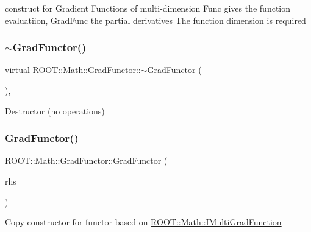 construct for Gradient Functions of multi-\/dimension Func gives the function evaluatiion, Grad\+Func the partial derivatives The function dimension is required \mbox{\label{classROOT_1_1Math_1_1GradFunctor_a1dfc4e8382f679a935eae97c5e7ee4dd}} 
\subsubsection{\texorpdfstring{$\sim$GradFunctor()}{~GradFunctor()}\hspace{0.1cm}{\footnotesize\ttfamily [1/2]}}
{\footnotesize\ttfamily virtual R\+O\+O\+T\+::\+Math\+::\+Grad\+Functor\+::$\sim$\+Grad\+Functor (\begin{DoxyParamCaption}{ }\end{DoxyParamCaption})\hspace{0.3cm}{\ttfamily [inline]}, {\ttfamily [virtual]}}

Destructor (no operations) \mbox{\label{classROOT_1_1Math_1_1GradFunctor_a629b55d9f326dbf39e5c3ccfb4678579}} 
\subsubsection{\texorpdfstring{GradFunctor()}{GradFunctor()}\hspace{0.1cm}{\footnotesize\ttfamily [5/10]}}
{\footnotesize\ttfamily R\+O\+O\+T\+::\+Math\+::\+Grad\+Functor\+::\+Grad\+Functor (\begin{DoxyParamCaption}\item[{const \mbox{\hyperlink{classROOT_1_1Math_1_1GradFunctor}{Grad\+Functor}} \&}]{rhs }\end{DoxyParamCaption})\hspace{0.3cm}{\ttfamily [inline]}}

Copy constructor for functor based on \mbox{\hyperlink{namespaceROOT_1_1Math_a014e019aaf9304a00e9231bd9ed232fb}{R\+O\+O\+T\+::\+Math\+::\+I\+Multi\+Grad\+Function}} \mbox{\label{classROOT_1_1Math_1_1GradFunctor_a68c75192981688e292ee84be652a8ec4}} 
